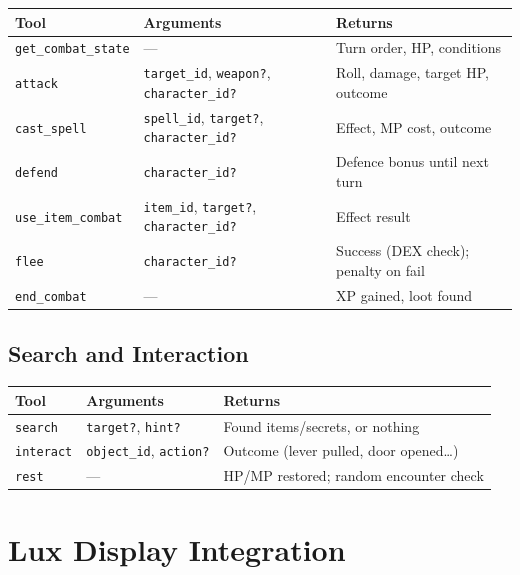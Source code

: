 \documentclass[a4paper,10pt]{article}
\newcommand{\tool}[1]{\texttt{#1}}
\newcommand{\field}[1]{\texttt{#1}}
\begin{document}
\begin{center}
\begin{tabular}{lp{4cm}p{5cm}}
\toprule
\textbf{Tool} & \textbf{Arguments} & \textbf{Returns} \\
\midrule
\tool{get\_combat\_state}
  & ---
  & Turn order, HP, conditions \\
\tool{attack}
  & \field{target\_id}, \field{weapon?}, \field{character\_id?}
  & Roll, damage, target HP, outcome \\
\tool{cast\_spell}
  & \field{spell\_id}, \field{target?}, \field{character\_id?}
  & Effect, MP cost, outcome \\
\tool{defend}
  & \field{character\_id?}
  & Defence bonus until next turn \\
\tool{use\_item\_combat}
  & \field{item\_id}, \field{target?}, \field{character\_id?}
  & Effect result \\
\tool{flee}
  & \field{character\_id?}
  & Success (DEX check); penalty on fail \\
\tool{end\_combat}
  & ---
  & XP gained, loot found \\
\bottomrule
\end{tabular}
\end{center}

\subsection{Search and Interaction}

\begin{center}
\begin{tabular}{lp{4cm}p{5cm}}
\toprule
\textbf{Tool} & \textbf{Arguments} & \textbf{Returns} \\
\midrule
\tool{search}
  & \field{target?}, \field{hint?}
  & Found items/secrets, or nothing \\
\tool{interact}
  & \field{object\_id}, \field{action?}
  & Outcome (lever pulled, door opened\ldots) \\
\tool{rest}
  & ---
  & HP/MP restored; random encounter check \\
\bottomrule
\end{tabular}
\end{center}

\section{Lux Display Integration}
\end{document}
